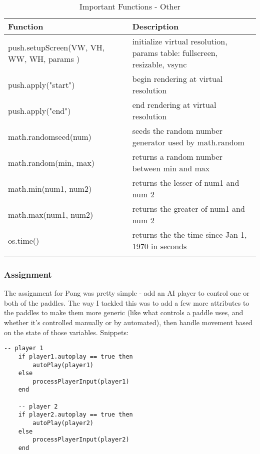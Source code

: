 \newpage

\begin{table}[h]
\caption{Important Functions - Other}
\label{pong-important-functions-other}
\begin{tabular}{p{6cm}p{7.5cm}}
\hline
Function           & Description                                     \\ \hline
push.setupScreen(VW, VH, WW, WH, { params }) & initialize virtual resolution, params table:  fullscreen, resizable, vsync \\ 
push.apply("start") & begin rendering at virtual resolution \\
push.apply("end") & end rendering at virtual resolution \\
math.randomseed(num) & seeds the random number generator used by math.random \\
math.random(min, max) & returns a random number between min and max \\
math.min(num1, num2) & returns the lesser of num1 and num 2 \\
math.max(num1, num2) & returns the greater of num1 and num 2 \\
os.time() &  returns the the time since Jan 1, 1970 in seconds \\
 &   \\ \hline
\end{tabular}
\end{table}
\newpage
\subsubsection{Assignment}

The assignment for Pong was pretty simple - add an AI player to control one or both of the paddles. The way I tackled this was to add a few more attributes to the paddles to make them more generic (like what controls a paddle uses, and whether it's controlled manually or by automated), then handle movement based on the state of those variables. Snippets:

\begin{lstlisting}[language={[5.0]Lua}]
    -- player 1
    if player1.autoplay == true then
        autoPlay(player1)
    else
        processPlayerInput(player1)
    end

    -- player 2
    if player2.autoplay == true then
        autoPlay(player2)
    else
        processPlayerInput(player2)
    end
\end{lstlisting}

